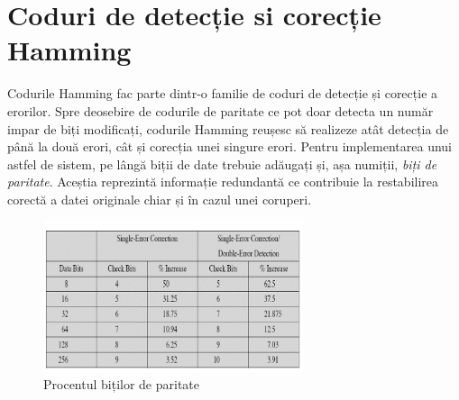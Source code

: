 \documentclass[12pt,a4paper]{report}
\begin{document}
\section{Coduri de detecție si corecție Hamming} \label{hamming}

Codurile Hamming fac parte dintr-o familie de coduri de detecție și corecție a erorilor. Spre deosebire de codurile de paritate ce pot doar detecta un număr impar de biți modificați, codurile Hamming reușesc să realizeze atât detecția de până la două erori, cât și corecția unei singure erori. Pentru implementarea unui astfel de sistem, pe lângă biții de date trebuie adăugați și, așa numiții, \textit{biți de paritate}. Aceștia reprezintă informație redundantă ce contribuie la restabilirea corectă a datei originale chiar și în cazul unei coruperi.
\iftrue
\begin{figure}[th]
\centering
\includegraphics[width=3in]{pics/hamming.png}
  \caption[Procentul biților de paritate]{Procentul biților de paritate\protect\footnotemark}
  \label{fig:pic3}
\end{figure}
\fi
\end{document}
